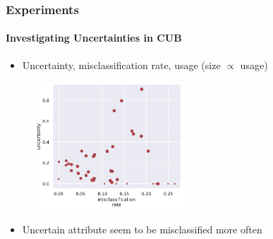 \documentclass[9pt]{beamer}
\begin{document}
\begin{frame}	
\frametitle{Experiments}
\framesubtitle{Investigating Uncertainties in CUB}
\begin{itemize}
	\item Uncertainty, misclassification rate, usage (size $\propto$ usage)
\end{itemize}
	\begin{figure}
		\centering
		\includegraphics[width=0.5\textwidth]{images/error_sigma_corr_all.pdf} 
	\end{figure}
	\begin{itemize}
		\item Uncertain attribute seem to be misclassified more often
	\end{itemize}
\end{frame} 
\end{document}
